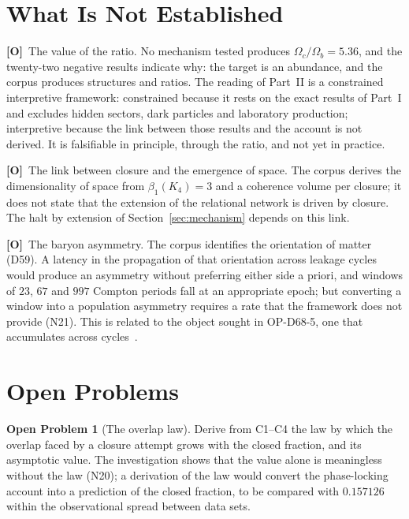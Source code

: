 \documentclass[11pt,a4paper]{article}
\theoremstyle{plain}
\theoremstyle{definition}
\newtheorem{openproblem}{Open Problem}
\theoremstyle{remark}
\newcommand{\statO}{\textbf{[O]}}
\begin{document}
\section{What Is Not Established}
\label{sec:notestablished}

\statO\ The value of the ratio. No mechanism tested produces $\Omega_c/\Omega_b=5.36$, and the twenty-two negative results indicate why: the target is an abundance, and the corpus produces structures and ratios. The reading of Part~II is a constrained interpretive framework: constrained because it rests on the exact results of Part~I and excludes hidden sectors, dark particles and laboratory production; interpretive because the link between those results and the account is not derived. It is falsifiable in principle, through the ratio, and not yet in practice.

\statO\ The link between closure and the emergence of space. The corpus derives the dimensionality of space from $\beta_1(K_4)=3$ and a coherence volume per closure; it does not state that the extension of the relational network is driven by closure. The halt by extension of Section~\ref{sec:mechanism} depends on this link.

\statO\ The baryon asymmetry. The corpus identifies the orientation of matter (D59). A latency in the propagation of that orientation across leakage cycles would produce an asymmetry without preferring either side a priori, and windows of $23$, $67$ and $997$ Compton periods fall at an appropriate epoch; but converting a window into a population asymmetry requires a rate that the framework does not provide (N21). This is related to the object sought in OP-D68-5, one that accumulates across cycles~\citep{D68}.

\section{Open Problems}
\label{sec:ops}

\begin{openproblem}[The overlap law]\label{op:overlap}
Derive from C1--C4 the law by which the overlap faced by a closure attempt grows with the closed fraction, and its asymptotic value. The investigation shows that the value alone is meaningless without the law (N20); a derivation of the law would convert the phase-locking account into a prediction of the closed fraction, to be compared with $0.157126$ within the observational spread between data sets.
\end{openproblem}
\end{document}
